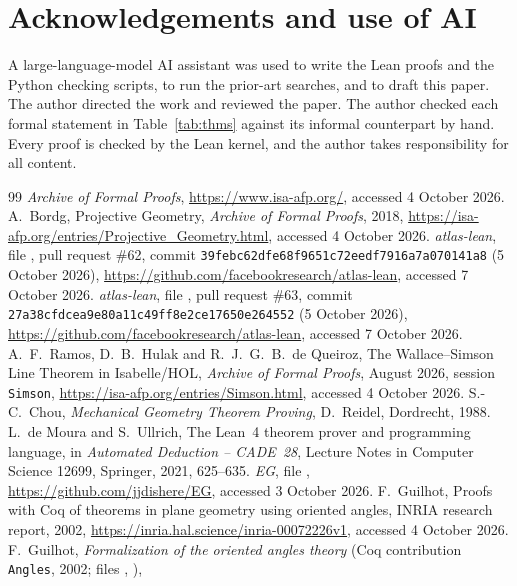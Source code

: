 \documentclass[11pt]{article}
\theoremstyle{definition}
\theoremstyle{remark}
\begin{document}
\section*{Acknowledgements and use of AI}
A large-language-model AI assistant was used to write the Lean proofs and the Python checking
scripts, to run the prior-art searches, and to draft this paper. The author directed the work and
reviewed the paper. The author checked each formal statement in Table~\ref{tab:thms} against its
informal counterpart by hand.
Every proof is checked by the Lean kernel, and the author takes responsibility for all content.

\begin{thebibliography}{99}\sloppy
{} \emph{Archive of Formal Proofs}, \url{https://www.isa-afp.org/}, accessed 4 October
2026.
 A.~Bordg, Projective Geometry, \emph{Archive of Formal Proofs}, 2018,
\url{https://isa-afp.org/entries/Projective_Geometry.html}, accessed 4 October 2026.
 \emph{atlas-lean}, file
, pull request \#62, commit
\texttt{39febc62dfe68f9651c72eedf7916a7a070141a8} (5 October 2026),
\url{https://github.com/facebookresearch/atlas-lean}, accessed 7 October 2026.
 \emph{atlas-lean}, file
, pull request \#63, commit
\texttt{27a38cfdcea9e80a11c49ff8e2ce17650e264552} (5 October 2026),
\url{https://github.com/facebookresearch/atlas-lean}, accessed 7 October 2026.
 A.~F.~Ramos, D.~B.~Hulak and R.~J.~G.~B.~de Queiroz, The Wallace--Simson Line
Theorem in Isabelle/HOL, \emph{Archive of Formal Proofs}, August 2026, session \texttt{Simson},
\url{https://isa-afp.org/entries/Simson.html}, accessed 4 October 2026.
 S.-C.~Chou, \emph{Mechanical Geometry Theorem Proving}, D.~Reidel, Dordrecht, 1988.
 L.~de Moura and S.~Ullrich, The Lean~4 theorem prover and programming language, in
\emph{Automated Deduction -- CADE~28}, Lecture Notes in Computer Science 12699, Springer, 2021,
625--635.
 \emph{EG}, file ,
\url{https://github.com/jjdishere/EG}, accessed 3 October 2026.
 F.~Guilhot, Proofs with Coq of theorems in plane geometry using oriented angles,
INRIA research report, 2002, \url{https://inria.hal.science/inria-00072226v1}, accessed 4 October
2026.
 F.~Guilhot, \emph{Formalization of the oriented angles theory} (Coq
contribution \texttt{Angles}, 2002; files , ),

\end{thebibliography}
\end{document}
